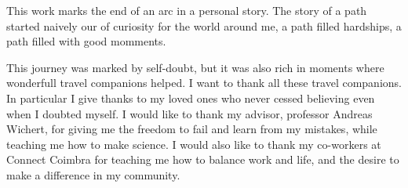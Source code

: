 
\begin{acknowledgments} 

This work marks the end of an arc in a personal story. The story of a path started naively our of curiosity for the world around me, a path filled hardships, a path filled with good momments.

This journey was marked by self-doubt, but it was also rich in moments where wonderfull travel companions helped. I want to thank all these travel companions.
In particular I give thanks to my loved ones who never cessed believing even when I doubted myself.
I would like to thank my advisor, professor Andreas Wichert, for giving me the freedom to fail and learn from my mistakes, while teaching me how to make science.
I would also like to thank my co-workers at Connect Coimbra for teaching me how to balance work and life, and the desire to make a difference in my community.
 
\end{acknowledgments}
\clearpage
\thispagestyle{empty}
\cleardoublepage
